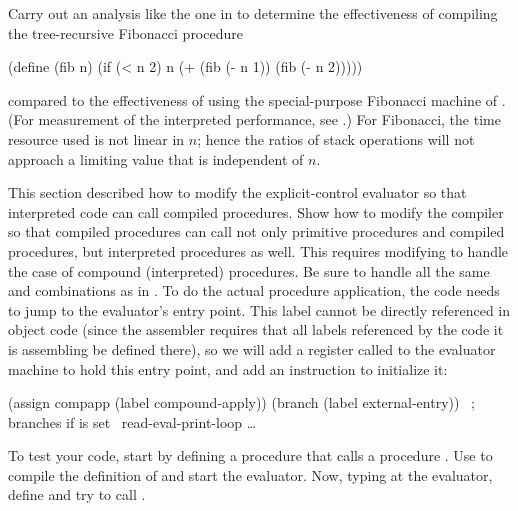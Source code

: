 \begin{exercise}
	\label{Exercise 5.46}
	Carry out an analysis like the one in  to determine the effectiveness of compiling the tree-recursive Fibonacci procedure
	\begin{scheme}
	  (define (fib n)
	    (if (< n 2)
	        n
	        (+ (fib (- n 1))
	          (fib (- n 2)))))
	\end{scheme}
	compared to the effectiveness of using the special-purpose Fibonacci machine of .
	(For measurement of the interpreted performance, see .)
	For Fibonacci, the time resource used is not linear in \( n \);
	hence the ratios of stack operations will not approach a limiting value that is independent of \( n \).
\end{exercise}



\begin{exercise}
	\label{Exercise 5.47}
	This section described how to modify the explicit-control evaluator so that interpreted code can call compiled procedures.
	Show how to modify the compiler so that compiled procedures can call not only primitive procedures and compiled procedures, but interpreted procedures as well.
	This requires modifying  to handle the case of compound (interpreted) procedures.
	Be sure to handle all the same  and  combinations as in .
	To do the actual procedure application, the code needs to jump to the evaluator’s  entry point.
	This label cannot be directly referenced in object code (since the assembler requires that all labels referenced by the code it is assembling be defined there), so we will add a register called  to the evaluator machine to hold this entry point, and add an instruction to initialize it:
	\begin{scheme}
	   (assign compapp (label compound-apply))
	   (branch (label external-entry)) ~\textrm{; branches if  is set}~
	  read-eval-print-loop …
	\end{scheme}
	To test your code, start by defining a procedure  that calls a procedure .
	Use  to compile the definition of  and start the evaluator.
	Now, typing at the evaluator, define  and try to call .
\end{exercise}



